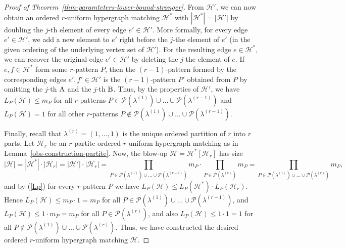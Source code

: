 \documentclass{aic}
\theoremstyle{definition}
\numberwithin{equation}{section}
\numberwithin{figure}{section}
\newcommand{\HH}{\mathcal{H}}
\newcommand{\PP}{\mathcal{P}}
\begin{document}
\begin{proof}[Proof of Theorem~\ref{thm-paramteters-lower-bound-stronger}]
From $\HH'$, we can now obtain an ordered $r$-uniform hypergraph matching $\HH^*$ with $|\HH^*|=|\HH'|$ by doubling the $j$-th element of every edge $e'\in \HH'$. More formally, for every edge $e'\in \HH'$, we add a new element to $e'$ right before the $j$-the element of $e'$ (in the given ordering of the underlying vertex set of $\HH'$). For the resulting edge $e\in \HH^*$, we can recover the original edge $e'\in \HH'$ by deleting the $j$-the element of $e$. If $e,f\in \HH^*$ form some $r$-pattern $P$, then the $(r-1)$-pattern formed by the corresponding edges $e',f'\in \HH'$ is the $(r-1)$-pattern $P'$ obtained from $P$ by omitting the $j$-th $\rm A$ and the $j$-th $\rm B$. Thus, by the properties of $\HH'$, we have $L_P(\HH)\le m_P$ for all $r$-patterns $P\in \PP(\lambda^{(1)})\cup\dots\cup \PP(\lambda^{(r-1)})$ and $L_P(\HH)=1$ for all other $r$-patterns $P\not\in \PP(\lambda^{(1)})\cup\dots\cup \PP(\lambda^{(r-1)})$.

Finally, recall that $\lambda^{(r)}=(1,\dots,1)$ is the unique ordered partition of $r$ into $r$ parts. Let $\HH_r$ be an $r$-partite ordered $r$-uniform hypergraph matching as in Lemma~\ref{obs-construction-partite}. Now, the blow-up $\HH=\HH^*[\HH_r]$ has size
\[|\HH|=|\HH^*|\cdot |\HH_r|=|\HH'|\cdot |\HH_r|=\prod_{P\in \PP(\lambda^{(1)})\cup\dots\cup \PP(\lambda^{(r-1)})} m_{P}\cdot \prod_{P\in \PP(\lambda^{(r)})} m_{P}=\prod_{P\in \PP(\lambda^{(1)})\cup\dots\cup \PP(\lambda^{(r)})} m_{P},\]
and by (\ref{Lp}) for every $r$-pattern $P$ we have $L_P(\HH)\le L_P(\HH^*)\cdot L_P(\HH_r)$. Hence $L_P(\HH)\le m_P\cdot 1=m_P$ for all $P\in \PP(\lambda^{(1)})\cup\dots\cup \PP(\lambda^{(r-1)})$, and $L_P(\HH)\le 1\cdot m_P=m_P$ for all $P\in \PP(\lambda^{(r)})$, and also $L_P(\HH)\le 1\cdot 1=1$ for all $P\not\in \PP(\lambda^{(1)})\cup\dots\cup \PP(\lambda^{(r)})$. Thus, we have constructed the desired ordered $r$-uniform hypergraph matching $\HH$.
\end{proof}
\end{document}
